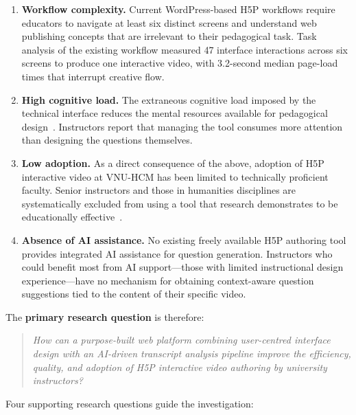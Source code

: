 \begin{enumerate}
  \item \textbf{Workflow complexity.} Current WordPress-based H5P workflows
  require educators to navigate at least six distinct screens and understand
  web publishing concepts that are irrelevant to their pedagogical task.
  Task analysis of the existing workflow measured 47 interface interactions
  across six screens to produce one interactive video, with 3.2-second
  median page-load times that interrupt creative flow.

  \item \textbf{High cognitive load.} The extraneous cognitive load imposed
  by the technical interface reduces the mental resources available for
  pedagogical design~\cite{chandler1991,mayer2009}. Instructors report that
  managing the tool consumes more attention than designing the questions
  themselves.

  \item \textbf{Low adoption.} As a direct consequence of the above, adoption
  of H5P interactive video at VNU-HCM has been limited to technically
  proficient faculty. Senior instructors and those in humanities disciplines
  are systematically excluded from using a tool that research demonstrates
  to be educationally effective~\cite{davis1989,hadullo2017}.

  \item \textbf{Absence of AI assistance.} No existing freely available H5P
  authoring tool provides integrated AI assistance for question generation.
  Instructors who could benefit most from AI support---those with limited
  instructional design experience---have no mechanism for obtaining
  context-aware question suggestions tied to the content of their specific
  video.
\end{enumerate}

The \textbf{primary research question} is therefore:

\begin{quote}
  \itshape How can a purpose-built web platform combining user-centred
  interface design with an AI-driven transcript analysis pipeline improve
  the efficiency, quality, and adoption of H5P interactive video authoring
  by university instructors?
\end{quote}

Four supporting research questions guide the investigation:

